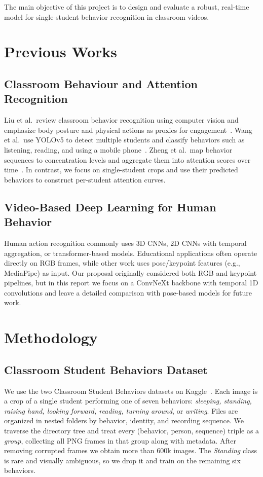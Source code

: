 \documentclass[conference]{IEEEtran}
\begin{document}
The main objective of this project is to design and evaluate a robust, real-time model for single-student behavior recognition in classroom videos.

\section{Previous Works}

\subsection{Classroom Behaviour and Attention Recognition}

Liu et al.\ review classroom behavior recognition using computer vision and emphasize body posture and physical actions as proxies for engagement~\cite{liu2025classroomreview}. Wang et al.\ use YOLOv5 to detect multiple students and classify behaviors such as listening, reading, and using a mobile phone~\cite{wang2023yolov5classroom}. Zheng et al.\ map behavior sequences to concentration levels and aggregate them into attention scores over time~\cite{zheng2022attention}. In contrast, we focus on single-student crops and use their predicted behaviors to construct per-student attention curves.

\subsection{Video-Based Deep Learning for Human Behavior}

Human action recognition commonly uses 3D CNNs, 2D CNNs with temporal aggregation, or transformer-based models. Educational applications often operate directly on RGB frames, while other work uses pose/keypoint features (e.g., MediaPipe) as input. Our proposal originally considered both RGB and keypoint pipelines, but in this report we focus on a ConvNeXt backbone with temporal 1D convolutions and leave a detailed comparison with pose-based models for future work.

\section{Methodology}

\subsection{Classroom Student Behaviors Dataset}

We use the two Classroom Student Behaviors datasets on Kaggle~\cite{csb,csb2}. Each image is a crop of a single student performing one of seven behaviors: \textit{sleeping, standing, raising hand, looking forward, reading, turning around}, or \textit{writing}. Files are organized in nested folders by behavior, identity, and recording sequence. We traverse the directory tree and treat every (behavior, person, sequence) triple as a \textit{group}, collecting all PNG frames in that group along with metadata. After removing corrupted frames we obtain more than 600k images. The \textit{Standing} class is rare and visually ambiguous, so we drop it and train on the remaining six behaviors.
\end{document}
